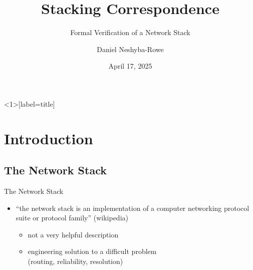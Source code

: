 \documentclass{beamer}
\title{Stacking Correspondence}
\subtitle{Formal Verification of a Network Stack}
\author{Daniel Neshyba-Rowe}
\institute{Lewis \& Clark}
\date{April 17, 2025}
\begin{document}
\begin{frame}<1>[label=title]
\titlepage
\end{frame}


\section{Introduction}

\subsection{The Network Stack}
\begin{frame}{The Network Stack}
    

    \begin{itemize}
        \item<1-> ``the network stack is an implementation of a computer networking protocol suite or protocol family'' (wikipedia)
        \begin{itemize}
            \item<2-> not a very helpful description
            \item<2-> engineering solution to a difficult problem \\(routing, reliability, resolution)
        \end{itemize}
        
    \end{itemize}
    

\end{frame}
\end{document}
